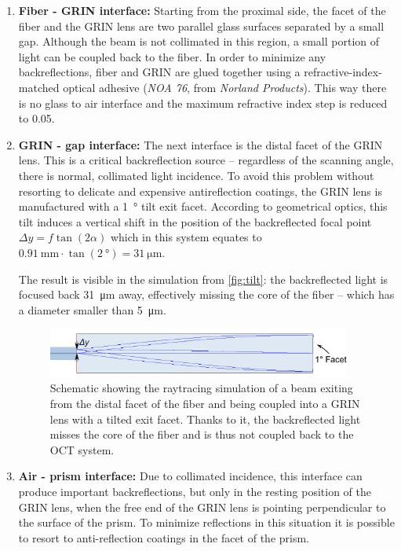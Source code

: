 \begin{enumerate}

\item \textbf{Fiber - GRIN interface:}
Starting from the proximal side, the facet of the fiber and the GRIN lens are two parallel glass surfaces separated by a small gap. Although the beam is not collimated in this region, a small portion of light can be coupled back to the fiber. In order to minimize any backreflections, fiber and GRIN are glued together using a refractive-index-matched optical adhesive (\textit{NOA 76}, from \textit{Norland Products}). This way there is no glass to air interface and the maximum refractive index step is reduced to \SI{0.05}{}.

\item \textbf{GRIN - gap interface:}
The next interface is the distal facet of the GRIN lens. This is a critical backreflection source -- regardless of the scanning angle, there is normal, collimated light incidence. To avoid this problem without resorting to delicate and expensive antireflection coatings, the GRIN lens is manufactured with a \SI{1}{\degree} tilt exit facet. According to geometrical optics, this tilt induces a vertical shift in the position of the backreflected focal point $\Delta y = f \tan(2\alpha)$ which in this system equates to $\SI{0.91}{\milli\meter} \cdot \tan (\SI{2}{\degree}) = \SI{31}{\micro\meter}$.

The result is visible in the simulation from \autoref{fig:tilt}: the backreflected light is focused back \SI{31}{\micro\meter} away, effectively missing the core of the fiber -- which has a diameter smaller than \SI{5}{\micro\meter}.

\begin{figure}[h!]\centering
      \includegraphics[width=10cm]{figures/30_DesignSimulation/Optical/backreflection.pdf}
      \caption{Schematic showing the raytracing simulation of a beam exiting from the distal facet of the fiber and being coupled into a GRIN lens with a tilted exit facet. Thanks to it, the backreflected light misses the core of the fiber and is thus not coupled back to the OCT system.}
      \label{fig:tilt}
\end{figure}

\item \textbf{Air - prism interface:} Due to collimated incidence, this interface can produce important backreflections, but only in the resting position of the GRIN lens, when the free end of the GRIN lens is pointing perpendicular to the surface of the prism. To minimize reflections in this situation it is possible to resort to anti-reflection coatings in the facet of the prism. 


\end{enumerate}
